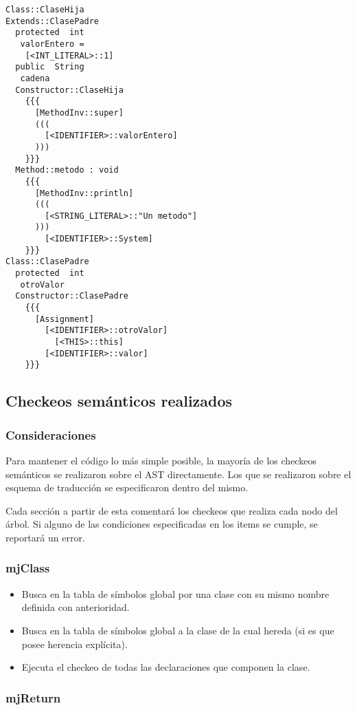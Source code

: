 \documentclass [a4paper,abstracton,titlepage]{scrartcl}
\begin{document}
\begin{lstlisting}
Class::ClaseHija
Extends::ClasePadre
  protected  int
   valorEntero = 
    [<INT_LITERAL>::1]
  public  String
   cadena
  Constructor::ClaseHija
    {{{
      [MethodInv::super]
      (((
        [<IDENTIFIER>::valorEntero]
      )))
    }}}
  Method::metodo : void
    {{{
      [MethodInv::println]
      (((
        [<STRING_LITERAL>::"Un metodo"]
      )))
        [<IDENTIFIER>::System]
    }}}
Class::ClasePadre
  protected  int
   otroValor
  Constructor::ClasePadre
    {{{
      [Assignment]
        [<IDENTIFIER>::otroValor]
          [<THIS>::this]
        [<IDENTIFIER>::valor]
    }}}
\end{lstlisting}

\subsection{Checkeos semánticos realizados}
  \subsubsection{Consideraciones}

Para mantener el código lo más simple posible, la mayoría de los checkeos
semánticos se realizaron sobre el AST directamente. Los que se realizaron sobre
el esquema de traducción se especificaron dentro del mismo.

Cada sección a partir de esta comentará los checkeos que realiza cada nodo del
árbol. Si alguno de las condiciones especificadas en los items se cumple, se
reportará un error.

  \subsubsection{mjClass}

  \begin{itemize}
   \item Busca en la tabla de símbolos global por una clase con su mismo nombre
definida con anterioridad.
   \item Busca en la tabla de símbolos global a la clase de la cual hereda (si
es que posee herencia explícita).
   \item Ejecuta el checkeo de todas las declaraciones que componen la clase.
  \end{itemize}

  \subsubsection{mjReturn}
  
\end{document}
